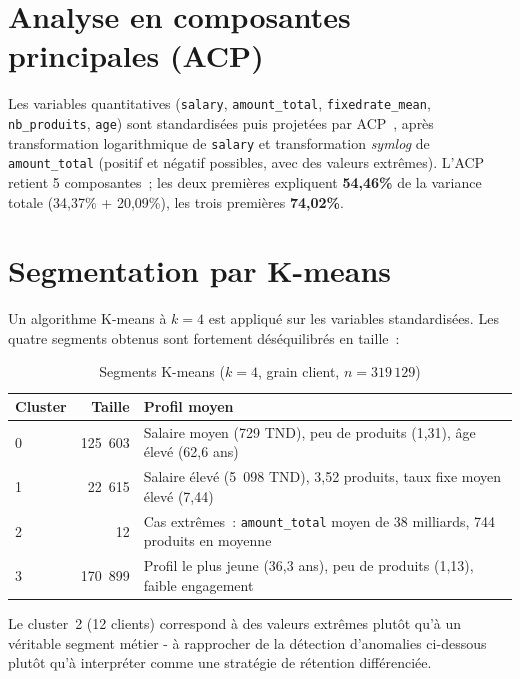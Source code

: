 \documentclass[11pt,a4paper]{report}
\begin{document}
\section{Analyse en composantes principales (ACP)}

Les variables quantitatives (\texttt{salary}, \texttt{amount\_total},
\texttt{fixedrate\_mean}, \texttt{nb\_produits}, \texttt{age}) sont
standardis\'ees puis projet\'ees par ACP~\citep{jolliffe2002pca}, apr\`es
transformation logarithmique de \texttt{salary} et transformation
\emph{symlog} de \texttt{amount\_total} (positif et n\'egatif possibles, avec
des valeurs extr\^emes). L'ACP retient 5 composantes~; les deux premi\`eres
expliquent \textbf{54,46\%} de la variance totale (34,37\% + 20,09\%), les
trois premi\`eres \textbf{74,02\%}.

\section{Segmentation par K-means}

Un algorithme K-means \`a $k=4$ est appliqu\'e sur les variables standardis\'ees.
Les quatre segments obtenus sont fortement d\'es\'equilibr\'es en taille~:

\begin{table}[H]
\centering
\begin{tabular}{lrl}
\toprule
\textbf{Cluster} & \textbf{Taille} & \textbf{Profil moyen} \\
\midrule
0 & 125~603 & Salaire moyen (729 TND), peu de produits (1,31), \^age \'elev\'e (62,6 ans) \\
1 &  22~615 & Salaire \'elev\'e (5~098 TND), 3,52 produits, taux fixe moyen \'elev\'e (7,44) \\
2 &      12 & Cas extr\^emes~: \texttt{amount\_total} moyen de 38 milliards, 744 produits en moyenne \\
3 & 170~899 & Profil le plus jeune (36,3 ans), peu de produits (1,13), faible engagement \\
\bottomrule
\end{tabular}
\caption{Segments K-means ($k=4$, grain client, $n=319\,129$)}
\label{tab:kmeans}
\end{table}

Le cluster~2 (12 clients) correspond \`a des valeurs extr\^emes plut\^ot qu'\`a un
v\'eritable segment m\'etier - \`a rapprocher de la d\'etection d'anomalies
ci-dessous plut\^ot qu'\`a interpr\'eter comme une strat\'egie de r\'etention
diff\'erenci\'ee.
\end{document}
